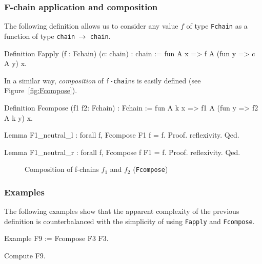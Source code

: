 \subsubsection{F-chain application and composition}

The following definition allows us to consider any value {$f$} 
of type 
\texttt{Fchain} as a function of type \texttt{chain $\mbox{$\rightarrow$}$ chain}.


\begin{Coqsrc}
Definition Fapply (f : Fchain) (c: chain) : chain  :=
 fun A  x =>  f  A (fun y => c A  y) x.
\end{Coqsrc}

In a similar way, \emph{composition} of \texttt{f-chain}s is easily defined
(see Figure~\vref{fig:Fcompose}).


\begin{Coqsrc}
Definition Fcompose (f1 f2: Fchain) : Fchain  :=
 fun   A k x =>  f1  A (fun y => f2 A k y) x.

Lemma F1_neutral_l : forall f, Fcompose F1 f = f.
Proof. reflexivity. Qed.

Lemma F1_neutral_r : forall f, Fcompose f F1 = f.
Proof. reflexivity. Qed.
\end{Coqsrc}

\begin{figure}[h]
  \centering
  \caption{Composition  of f-chains $f_1$ and $f_2$ (\texttt{Fcompose})}
  \label{fig:Fcompose}
\end{figure}
\subsubsection{Examples}

The following examples show that the apparent complexity of the previous 
definition is counterbalanced with the simplicity of using \texttt{Fapply}
and \texttt{Fcompose}.

\begin{Coqsrc}
Example F9 := Fcompose F3 F3.

Compute F9.
\end{Coqsrc}


